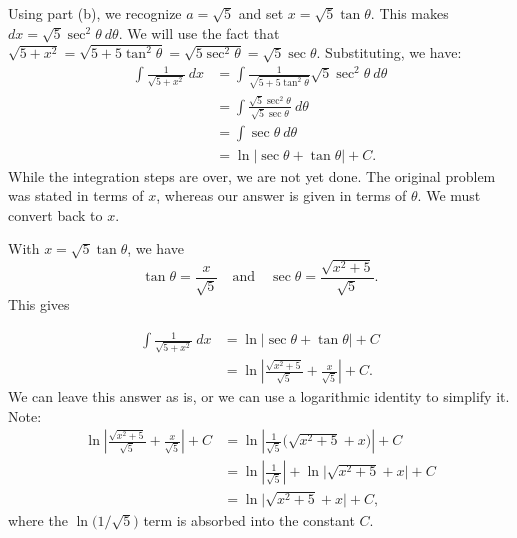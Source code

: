 \begin{solution}
Using part (b), we recognize $a=\sqrt{5}$ and  set $x= \sqrt{5}\tan \theta$. This makes $dx = \sqrt{5}\sec^2\theta\ d\theta$. We will use the fact that $\sqrt{5+x^2} = \sqrt{5+5\tan^2\theta} = \sqrt{5\sec^2\theta} = \sqrt{5}\sec\theta.$ Substituting, we have:
\begin{align*}
\int \frac{1}{\sqrt{5+x^2}}\ dx &= \int \frac{1}{\sqrt{5+5\tan^2\theta}}\sqrt{5}\sec^2\theta\ d\theta \\
			&= \int \frac{\sqrt{5}\sec^2\theta}{\sqrt{5}\sec\theta} \ d\theta\\
			&= \int \sec\theta\ d\theta\\
			&= \ln\big|\sec\theta+\tan\theta\big|+C.
\end{align*}
While the integration steps are over, we are not yet done. The original problem was stated in terms of $x$, whereas our answer is given in terms of $\theta$. We must convert back to $x$.

\begin{minipage}{.7\textwidth}
With $x=\sqrt{5}\tan\theta$, we have 
$$\tan \theta = \frac x{\sqrt{5}}\quad \text{and}\quad \sec\theta = \frac{\sqrt{x^2+5}}{\sqrt{5}}.$$
This gives
\end{minipage}
\begin{minipage}{.3\textwidth}
\end{minipage}

\begin{align*}
\int \frac{1}{\sqrt{5+x^2}}\ dx &= \ln\big|\sec\theta+\tan\theta\big|+C \\
     &= \ln\left|\frac{\sqrt{x^2+5}}{\sqrt{5}}+ \frac x{\sqrt{5}}\right|+C.
\end{align*}
We can leave this answer as is, or we can use a logarithmic identity to simplify it. Note:
\begin{align*}
\ln\left|\frac{\sqrt{x^2+5}}{\sqrt{5}}+ \frac x{\sqrt{5}}\right|+C &= \ln\left|\frac{1}{\sqrt{5}}\big(\sqrt{x^2+5}+ x\big)\right|+C \\
   &= \ln\left|\frac{1}{\sqrt{5}}\right| + \ln\big|\sqrt{x^2+5}+ x\big|+C\\
	&=	\ln\big|\sqrt{x^2+5}+ x\big|+C,
\end{align*}
where the $\ln\big(1/\sqrt{5}\big)$ term is absorbed into the constant $C$. %
\end{solution}

